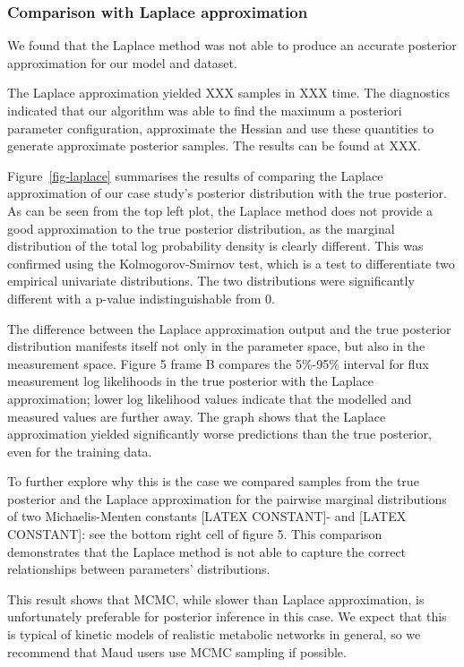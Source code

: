 \documentclass[journal=,manuscript=]{achemso}
\begin{document}
\hypertarget{comparison-with-laplace-approximation}{%
\subsubsection{Comparison with Laplace
approximation}\label{comparison-with-laplace-approximation}}

We found that the Laplace method was not able to produce an accurate
posterior approximation for our model and dataset.

The Laplace approximation yielded XXX samples in XXX time. The
diagnostics indicated that our algorithm was able to find the maximum a
posteriori parameter configuration, approximate the Hessian and use
these quantities to generate approximate posterior samples. The results
can be found at XXX.

Figure~\ref{fig-laplace} summarises the results of comparing the Laplace
approximation of our case study's posterior distribution with the true
posterior. As can be seen from the top left plot, the Laplace method
does not provide a good approximation to the true posterior
distribution, as the marginal distribution of the total log probability
density is clearly different. This was confirmed using the
Kolmogorov-Smirnov test, which is a test to differentiate two empirical
univariate distributions. The two distributions were significantly
different with a p-value indistinguishable from 0.

The difference between the Laplace approximation output and the true
posterior distribution manifests itself not only in the parameter space,
but also in the measurement space. Figure 5 frame B compares the
5\%-95\% interval for flux measurement log likelihoods in the true
posterior with the Laplace approximation; lower log likelihood values
indicate that the modelled and measured values are further away. The
graph shows that the Laplace approximation yielded significantly worse
predictions than the true posterior, even for the training data.

To further explore why this is the case we compared samples from the
true posterior and the Laplace approximation for the pairwise marginal
distributions of two Michaelis-Menten constants {[}LATEX CONSTANT{]}-
and {[}LATEX CONSTANT{]}: see the bottom right cell of figure 5. This
comparison demonstrates that the Laplace method is not able to capture
the correct relationships between parameters' distributions.

This result shows that MCMC, while slower than Laplace approximation, is
unfortunately preferable for posterior inference in this case. We expect
that this is typical of kinetic models of realistic metabolic networks
in general, so we recommend that Maud users use MCMC sampling if
possible.
\end{document}

